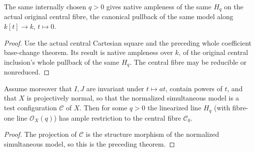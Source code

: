 \begin{theorem}
\label{thm:pl-original-normalized-tautological-central-ample}
\leanok
{}
The same internally chosen $q>0$ gives native ampleness of the
same $H_q$ on the actual original central fibre, the canonical
pullback of the same model along $k[t]\to k$, $t\mapsto0$.
\end{theorem}
\begin{proof}
\leanok
Use the actual central Cartesian square and the preceding whole
coefficient base-change theorem. Its result is native ampleness
over $k$, of the original central inclusion's whole pullback of
the same $H_q$. The central fibre may be reducible or nonreduced.
\end{proof}

\begin{theorem}
\label{thm:pl-original-normalized-tc-tautological-central-ample}
\leanok
{}
Assume moreover that $I,J$ are invariant under $t\mapsto at$, contain powers of
$t$, and that $X$ is projectively normal, so that the normalized simultaneous
model is a test configuration $\mathcal C$ of $X$. Then for some $q>0$ the
linearized line $H_q$ (with fibre-one line $\mathcal O_X(q)$) has ample
restriction to the central fibre $\mathcal C_0$.
\end{theorem}
\begin{proof}
\leanok
The projection of $\mathcal C$ is the structure morphism of the normalized
simultaneous model, so this is the preceding theorem.
\end{proof}
